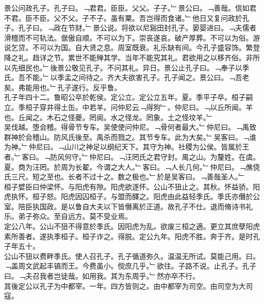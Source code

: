 \documentclass{zhvt-classic}
\begin{document}
\hspace*{2em}景公问政孔子。孔子曰。﹁君君。臣臣。父父。子子。﹂景公曰。﹁善哉。信如君不君。臣不臣。父不父。子不子。虽有粟。吾岂得而食诸。﹂他日又复问政於孔子。孔子曰。﹁政在节财。﹂景公说。将欲以尼谿田封孔子。晏婴进曰。﹁夫儒者滑稽而不可轨法。倨傲自顺。不可以为下。崇丧遂哀。破产厚葬。不可以为俗。游说乞贷。不可以为国。自大贤之息。周室既衰。礼乐缺有间。今孔子盛容饰。繁登降之礼。趋详之节。累世不能殚其学。当年不能究其礼。君欲用之以移齐俗。非所以先细民也。﹂後景公敬见孔子。不问其礼。异日。景公止孔子曰。﹁奉子以季氏。吾不能。﹂以季孟之间待之。齐大夫欲害孔子。孔子闻之。景公曰。﹁吾老矣。弗能用也。﹂孔子遂行。反乎鲁。\\
\hspace*{2em}孔子年四十二。鲁昭公卒於乾侯。定公立。定公立五年。夏。季平子卒。桓子嗣立。季桓子穿井得土缶。中若羊。问仲尼云﹁得狗﹂。仲尼曰。﹁以丘所闻。羊也。丘闻之。木石之怪夔。罔阆。水之怪龙。罔象。土之怪坟羊。﹂\\
\hspace*{2em}吴伐越。堕会稽。得骨节专车。吴使使问仲尼。﹁骨何者最大。﹂仲尼曰。﹁禹致群神於会稽山。防风氏後至。禹杀而戮之。其节专车。此为大矣。﹂吴客曰。﹁谁为神。﹂仲尼曰。﹁山川之神足以纲纪天下。其守为神。社稷为公侯。皆属於王者。﹂客曰。﹁防风何守。﹂仲尼曰。﹁汪罔氏之君守封。禺之山。为釐姓。在虞。夏。商为汪罔。於周为长翟。今谓之大人。﹂客曰。﹁人长几何。﹂仲尼曰。﹁僬侥氏三尺。短之至也。长者不过十之。数之极也。﹂於是吴客曰。﹁善哉圣人。﹂\\
\hspace*{2em}桓子嬖臣曰仲梁怀。与阳虎有隙。阳虎欲逐怀。公山不狃止之。其秋。怀益骄。阳虎执怀。桓子怒。阳虎因囚桓子。与盟而醳之。阳虎由此益轻季氏。季氏亦僭於公室。陪臣执国政。是以鲁自大夫以下皆僭离於正道。故孔子不仕。退而脩诗书礼乐。弟子弥众。至自远方。莫不受业焉。\\
\hspace*{2em}定公八年。公山不狃不得意於季氏。因阳虎为乱。欲废三桓之適。更立其庶孽阳虎素所善者。遂执季桓子。桓子诈之。得脱。定公九年。阳虎不胜。奔于齐。是时孔子年五十。\\
\hspace*{2em}公山不狃以费畔季氏。使人召孔子。孔子循道弥久。温温无所试。莫能己用。曰。﹁盖周文武起丰镐而王。今费虽小。傥庶几乎。﹂欲往。子路不说。止孔子。孔子曰。﹁夫召我者岂徒哉。如用我。其为东周乎。﹂然亦卒不行。\\
\hspace*{2em}其後定公以孔子为中都宰。一年。四方皆则之。由中都宰为司空。由司空为大司寇。\\
\end{document}
